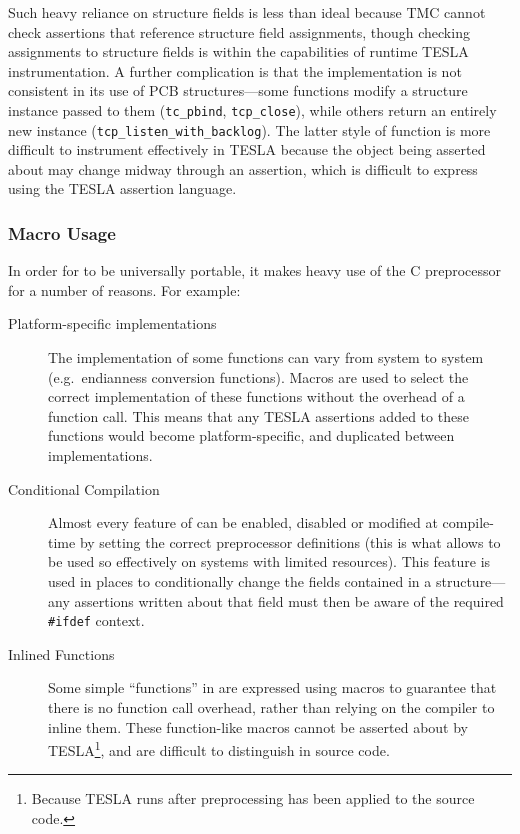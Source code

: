 Such heavy reliance on structure fields is less than ideal because TMC
cannot check assertions that reference structure field assignments,
though checking assignments to structure fields is within the
capabilities of runtime TESLA instrumentation.  A further complication
is that the implementation is not consistent in its use of PCB
structures---some functions modify a structure instance passed to them
(\texttt{tc_pbind}, \texttt{tcp_close}), while others
return an entirely new instance
(\texttt{tcp_listen_with_backlog}). The latter style of function
is more difficult to instrument effectively in TESLA because the object
being asserted about may change midway through an assertion, which is
difficult to express using the TESLA assertion language.

\subsubsection{Macro Usage}

In order for \lwip{} to be universally portable, it makes heavy use of the
C preprocessor for a number of reasons. For example:
\begin{description}
  \item[Platform-specific implementations] The implementation of some
  functions can vary from system to system (e.g.\ endianness conversion
  functions). Macros are used to select the correct implementation of
  these functions without the overhead of a function call. This means
  that any TESLA assertions added to these functions would become
  platform-specific, and duplicated between implementations.

  \item[Conditional Compilation] Almost every feature of \lwip{} can be
  enabled, disabled or modified at compile-time by setting the correct
  preprocessor definitions (this is what allows \lwip{} to be used so
  effectively on systems with limited resources). This feature
  is used in places to conditionally change the fields contained in a
  structure---any assertions written about that field must then be aware
  of the required \texttt{#ifdef} context.

  \item[Inlined Functions] Some simple ``functions'' in \lwip{} are expressed using
    macros to guarantee that there is no function call overhead, rather than
    relying on the compiler to inline them. These function-like macros cannot be
    asserted about by TESLA\footnote{Because TESLA runs after preprocessing has
    been applied to the source code.}, and are difficult to distinguish in source code.
\end{description}

